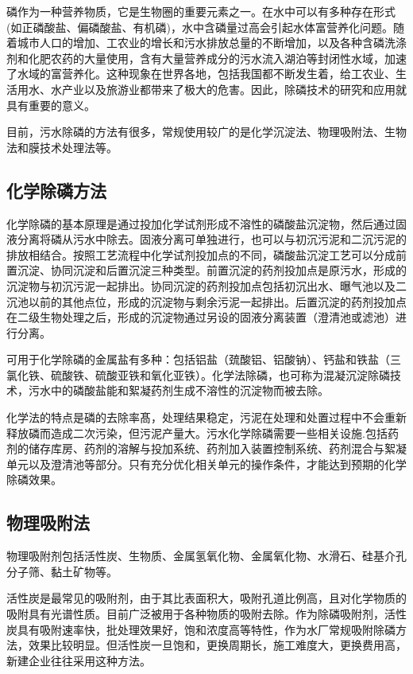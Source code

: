 \documentclass[]{book}
\begin{document}
磷作为一种营养物质，它是生物圈的重要元素之一。在水中可以有多种存在形式 (如正磷酸盐、偏磷酸盐、有机磷)，水中含磷量过高会引起水体富营养化问题。随着城市人口的增加、工农业的增长和污水排放总量的不断增加，以及各种含磷洗涤剂和化肥农药的大量使用，含有大量营养成分的污水流入湖泊等封闭性水域，加速了水域的富营养化。这种现象在世界各地，包括我国都不断发生着，给工农业、生活用水、水产业以及旅游业都带来了极大的危害。因此，除磷技术的研究和应用就具有重要的意义。

目前，污水除磷的方法有很多，常规使用较广的是化学沉淀法、物理吸附法、生物法和膜技术处理法等。

\hypertarget{ux5316ux5b66ux9664ux78f7ux65b9ux6cd5}{%
\subsection{化学除磷方法}\label{ux5316ux5b66ux9664ux78f7ux65b9ux6cd5}}

化学除磷的基本原理是通过投加化学试剂形成不溶性的磷酸盐沉淀物，然后通过固液分离将磷从污水中除去。固液分离可单独进行，也可以与初沉污泥和二沉污泥的排放相结合。按照工艺流程中化学试剂投加点的不同，磷酸盐沉淀工艺可以分成前置沉淀、协同沉淀和后置沉淀三种类型。前置沉淀的药剂投加点是原污水，形成的沉淀物与初沉污泥一起排出。协同沉淀的药剂投加点包括初沉出水、曝气池以及二沉池以前的其他点位，形成的沉淀物与剩余污泥一起排出。后置沉淀的药剂投加点在二级生物处理之后，形成的沉淀物通过另设的固液分离装置（澄清池或滤池）进行分离。

可用于化学除磷的金属盐有多种：包括铝盐（巯酸铝、铝酸钠）、钙盐和铁盐（三氯化铁、硫酸铁、硫酸亚铁和氧化亚铁）。化学法除磷，也可称为混凝沉淀除磷技术，污水中的磷酸盐能和絮凝药剂生成不溶性的沉淀物而被去除。

化学法的特点是磷的去除率髙，处理结果稳定，污泥在处理和处置过程中不会重新释放磷而造成二次污染，但污泥产量大。污水化学除磷需要一些相关设施.包括药剂的储存库房、药剂的溶解与投加系统、药剂加入装置控制系统、药剂混合与絮凝单元以及澄清池等部分。只有充分优化相关单元的操作条件，才能达到预期的化学除磷效果。

\hypertarget{ux7269ux7406ux5438ux9644ux6cd5}{%
\subsection{物理吸附法}\label{ux7269ux7406ux5438ux9644ux6cd5}}

物理吸附剂包括活性炭、生物质、金属氢氧化物、金属氧化物、水滑石、硅基介孔分子筛、黏土矿物等。

活性炭是最常见的吸附剂，由于其比表面积大，吸附孔道比例高，且对化学物质的吸附具有光谱性质。目前广泛被用于各种物质的吸附去除。作为除磷吸附剂，活性炭具有吸附速率快，批处理效果好，饱和浓度高等特性，作为水厂常规吸附除磷方法，效果比较明显。但活性炭一旦饱和，更换周期长，施工难度大，更换费用高，新建企业往往采用这种方法。
\end{document}
